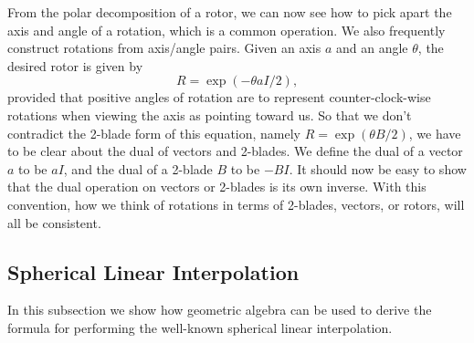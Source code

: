 \documentclass{article}
\begin{document}
From the polar decomposition of a rotor, we can now see how to pick apart
the axis and angle of a rotation, which is a common operation.  We also
frequently construct rotations from axis/angle pairs.  Given an axis
$a$ and an angle $\theta$, the desired rotor is given by
\begin{equation*}
R = \exp(-\theta aI/2),
\end{equation*}
provided that positive angles of rotation are to represent counter-clock-wise
rotations when viewing the axis as pointing toward us.  So that we don't contradict
the 2-blade form of this equation, namely $R=\exp(\theta B/2)$, we have to be
clear about the dual of vectors and 2-blades.  We define the dual of a vector
$a$ to be $aI$, and the dual of a 2-blade $B$ to be $-BI$.  It should now be
easy to show that the dual operation on vectors or 2-blades is its own inverse.
With this convention, how we think of rotations in terms of 2-blades, vectors,
or rotors, will all be consistent.

\subsection{Spherical Linear Interpolation}

In this subsection we show how geometric algebra can be used
to derive the formula for performing the well-known spherical
linear interpolation.
\end{document}
